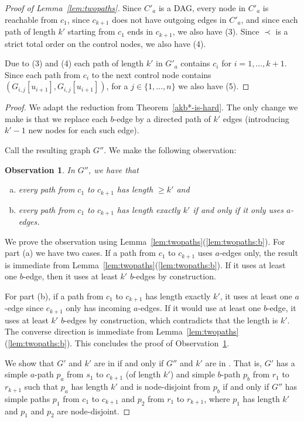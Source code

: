 \documentclass[a4paper,english]{lipics-v2016}
\theoremstyle{plain}
\newtheorem{observation}[theorem]{Observation}
\begin{document}
\begin{proof}[Proof of Lemma~\ref{lem:twopaths}]
  Since $C'_a$ is a DAG, every node in $C'_a$ is reachable from $c_1$,
      since $c_{k+1}$ does not have outgoing edges in $C'_a$, and since each
  path of length $k'$ starting from $c_1$ ends in $c_{k+1}$, we also have
  (3).
  Since $\prec$ is a strict total order on the control nodes, we also have (4).
  
    
  Due to (3) and (4) each path of length $k'$ in $G'_a$ contains $c_i$ for $i=1,\ldots, k+1$. Since each path from $c_i$ to the next control node contains $(G_{i,j}[u_{i+1}],G_{i,j}[u_{i+1}])$, for a $j \in \{1,\ldots,n\}$ we also have (5).
            \end{proof}


\TheoDisjointPaths*
\begin{proof}
  We adapt the reduction from Theorem~\ref{akb*-is-hard}.  The only
  change we make is that we replace each $b$-edge by a
  directed path of $k'$ edges (introducing $k'-1$ new nodes for each
  such edge). 

  \fbox{$\cdots$}
 Call the
  resulting graph $G''$. 
  We make the following observation:
 \begin{observation} \label{obs:replace-b}
                In $G''$, we have that
    \begin{enumerate}[(a)]
    \item every path from $c_1$ to $c_{k+1}$ has length $\geq k'$ and
    \item every path from $c_1$ to $c_{k+1}$ has length exactly $k'$ if
      and only if it only uses $a$-edges.
    \end{enumerate}
  \end{observation}
          We prove the observation using
  Lemma~\ref{lem:twopaths}(\ref{lem:twopaths:b}). For part (a) we
  have two cases. If a path from $c_1$ to $c_{k+1}$ uses $a$-edges only,
  the result is immediate from
  Lemma~\ref{lem:twopaths}(\ref{lem:twopaths:b}). If it uses at
  least one $b$-edge, then it uses at least $k'$ $b$-edges by
  construction. 

  For part (b), if a path from $c_1$ to $c_{k+1}$ has length
  exactly $k'$, it uses at least one $a$-edge since $c_{k+1}$ only has
  incoming $a$-edges. If it would use at least one
  $b$-edge, it uses at least $k'$ $b$-edges by construction, which
  contradicts that the length is $k'$. The converse direction is
  immediate from Lemma~\ref{lem:twopaths}(\ref{lem:twopaths:b}). This
  concludes the proof of Observation~\ref{obs:replace-b}.


  We show that $G'$ and $k'$ are in \knodecolordisjointpaths if and only
  if $G''$ and $k'$ are in \knodedisjointpaths. That is, $G'$ has a
  simple $a$-path $p_a$ from $s_1$ to $c_{k+1}$ (of
  length $k'$) and simple $b$-path $p_b$ from $r_1$ to
  $r_{k+1}$ such that $p_a$ has length $k'$ and is node-disjoint from $p_b$ if and only if $G''$ has simple paths $p_1$
  from $c_1$ to $c_{k+1}$ and $p_2$ from $r_1$ to $r_{k+1}$, where $p_1$
  has length $k'$ and $p_1$ and $p_2$ are node-disjoint.


\end{proof}
\end{document}
